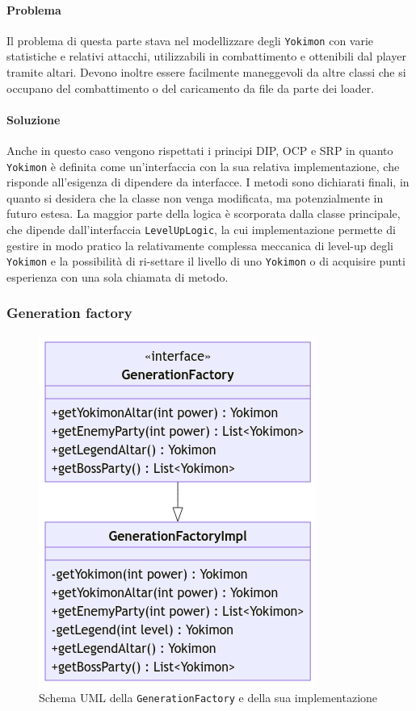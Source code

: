 \documentclass[a4paper,12pt]{report}
\begin{document}
\paragraph{Problema} Il problema di questa parte stava nel modellizzare degli \texttt{Yokimon} con varie statistiche e relativi attacchi, utilizzabili in combattimento e ottenibili dal player tramite altari. 
%
Devono inoltre essere facilmente maneggevoli da altre classi che si occupano del combattimento o del caricamento da file da parte dei loader.
\paragraph{Soluzione} Anche in questo caso vengono rispettati i principi DIP, OCP e SRP in quanto \texttt{Yokimon} è definita come un’interfaccia con la sua relativa implementazione, che risponde all’esigenza di dipendere da interfacce. 
%
I metodi sono dichiarati finali, in quanto si desidera che la classe non venga modificata, ma potenzialmente in futuro estesa.
%
La maggior parte della logica è scorporata dalla classe principale, che dipende dall’interfaccia \texttt{LevelUpLogic}, la cui implementazione permette di gestire in modo pratico la relativamente complessa meccanica di level-up degli \texttt{Yokimon} e la possibilità di ri-settare il livello di uno \texttt{Yokimon} o di acquisire punti esperienza con una sola chiamata di metodo.
\subsubsection{Generation factory}
\begin{figure}[H]
\centering{}
\includegraphics[width=0.55\columnwidth]{images/uml-generator-factory.png}
\caption{Schema UML della \texttt{GenerationFactory} e della sua implementazione}
\label{img:uml-generator-factory}
\end{figure}
\end{document}
